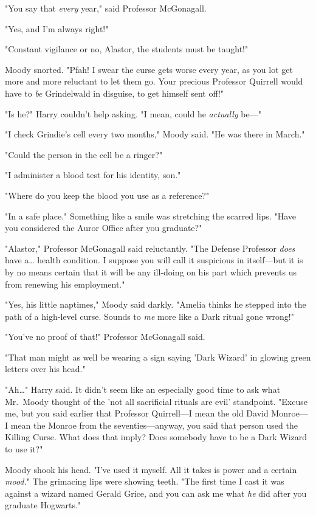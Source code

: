 "You say that \emph{every} year," said Professor McGonagall.

"Yes, and I'm always right!"

"Constant vigilance or no, Alastor, the students must be taught!"

Moody snorted. "Pfah! I swear the curse gets worse every year, as you lot get 
more and more reluctant to let them go. Your precious Professor Quirrell would 
have to \emph{be} Grindelwald in disguise, to get himself sent off!"

"Is he?" Harry couldn't help asking. "I mean, could he \emph{actually} be---"

"I check Grindie's cell every two months," Moody said. "He was there in March."

"Could the person in the cell be a ringer?"

"I administer a blood test for his identity, son."

"Where do you keep the blood you use as a reference?"

"In a safe place." Something like a smile was stretching the scarred lips. 
"Have you considered the Auror Office after you graduate?"

"Alastor," Professor McGonagall said reluctantly. "The Defense Professor 
\emph{does} have a{\ldots} health condition. I suppose you will call it 
suspicious in itself---but it is by no means certain that it will be any 
ill-doing on his part which prevents us from renewing his employment."

"Yes, his little naptimes," Moody said darkly. "Amelia thinks he stepped into 
the path of a high-level curse. Sounds to \emph{me} more like a Dark ritual 
gone wrong!"

"You've no proof of that!" Professor McGonagall said.

"That man might as well be wearing a sign saying 'Dark Wizard' in glowing green 
letters over his head."

"Ah{\ldots}" Harry said. It didn't seem like an especially good time to ask 
what Mr.~Moody thought of the 'not all sacrificial rituals are evil' 
standpoint. "Excuse me, but you said earlier that Professor Quirrell---I mean 
the old David Monroe---I mean the Monroe from the seventies---anyway, you said 
that person used the Killing Curse. What does that imply? Does somebody have to 
be a Dark Wizard to use it?"

Moody shook his head. "I've used it myself. All it takes is power and a certain 
\emph{mood.}" The grimacing lips were showing teeth. "The first time I cast it 
was against a wizard named Gerald Grice, and you can ask me what \emph{he} did 
after you graduate Hogwarts."

